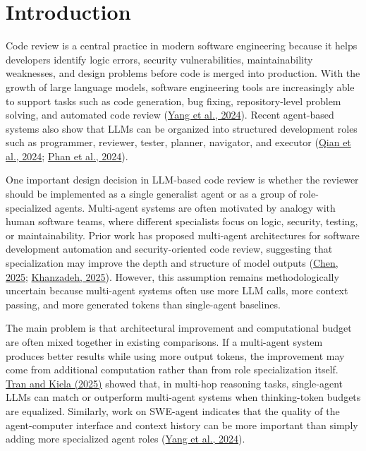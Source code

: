 \documentclass[pdflatex,sn-mathphys-num]{sn-jnl}
\newcommand{\apa}[2]{\hyperlink{cite.#1}{#2}}
\theoremstyle{thmstyleone}
\theoremstyle{thmstyletwo}
\theoremstyle{thmstylethree}
\begin{document}
\maketitle

\section{Introduction}\label{sec:intro}

Code review is a central practice in modern software engineering because it helps developers identify logic errors, security vulnerabilities, maintainability weaknesses, and design problems before code is merged into production. With the growth of large language models, software engineering tools are increasingly able to support tasks such as code generation, bug fixing, repository-level problem solving, and automated code review (\apa{yang2024}{Yang et al., 2024}). Recent agent-based systems also show that LLMs can be organized into structured development roles such as programmer, reviewer, tester, planner, navigator, and executor (\apa{qian2024}{Qian et al., 2024}; \apa{phan2024}{Phan et al., 2024}).

One important design decision in LLM-based code review is whether the reviewer should be implemented as a single generalist agent or as a group of role-specialized agents. Multi-agent systems are often motivated by analogy with human software teams, where different specialists focus on logic, security, testing, or maintainability. Prior work has proposed multi-agent architectures for software development automation and security-oriented code review, suggesting that specialization may improve the depth and structure of model outputs (\apa{chen2025}{Chen, 2025}; \apa{khanzadeh2025}{Khanzadeh, 2025}). However, this assumption remains methodologically uncertain because multi-agent systems often use more LLM calls, more context passing, and more generated tokens than single-agent baselines.

The main problem is that architectural improvement and computational budget are often mixed together in existing comparisons. If a multi-agent system produces better results while using more output tokens, the improvement may come from additional computation rather than from role specialization itself. \apa{tran2025}{Tran and Kiela (2025)} showed that, in multi-hop reasoning tasks, single-agent LLMs can match or outperform multi-agent systems when thinking-token budgets are equalized. Similarly, work on SWE-agent indicates that the quality of the agent-computer interface and context history can be more important than simply adding more specialized agent roles (\apa{yang2024}{Yang et al., 2024}).
\end{document}
